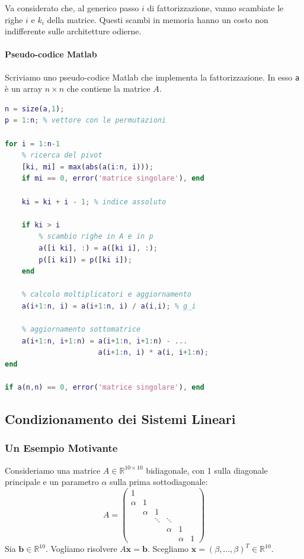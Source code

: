 Va considerato che, al generico passo $i$ di fattorizzazione, vanno scambiate le righe $i$ e $k_i$ della matrice. Questi scambi in memoria hanno un costo non indifferente sulle architetture odierne.

\paragraph{Pseudo-codice Matlab}
Scriviamo uno pseudo-codice Matlab che implementa la fattorizzazione. In esso \texttt{a} è un array $n \times n$ che contiene la matrice $A$.

\begin{lstlisting}[language=matlab, frame=none, numbers=none]
n = size(a,1);
p = 1:n; % vettore con le permutazioni

for i = 1:n-1
    % ricerca del pivot
    [ki, mi] = max(abs(a(i:n, i)));
    if mi == 0, error('matrice singolare'), end
    
    ki = ki + i - 1; % indice assoluto
    
    if ki > i
        % scambio righe in A e in p
        a([i ki], :) = a([ki i], :);
        p([i ki]) = p([ki i]);
    end
    
    % calcolo moltiplicatori e aggiornamento
    a(i+1:n, i) = a(i+1:n, i) / a(i,i); % g_i
    
    % aggiornamento sottomatrice
    a(i+1:n, i+1:n) = a(i+1:n, i+1:n) - ...
                      a(i+1:n, i) * a(i, i+1:n);
end

if a(n,n) == 0, error('matrice singolare'), end
\end{lstlisting}


\subsection{Condizionamento dei Sistemi Lineari}

\subsubsection{Un Esempio Motivante}
Consideriamo una matrice $A \in \mathbb{R}^{10 \times 10}$ bidiagonale, con 1 sulla diagonale principale e un parametro $\alpha$ sulla prima sottodiagonale:
$$ A = \begin{pmatrix} 
1 & & & & & \\
\alpha & 1 & & & & \\
& \alpha & 1 & & & \\
& & \ddots & \ddots & & \\
& & & \alpha & 1 & \\
& & & & \alpha & 1
\end{pmatrix} $$
Sia $\mathbf{b} \in \mathbb{R}^{10}$. Vogliamo risolvere $A\mathbf{x} = \mathbf{b}$.
Scegliamo $\mathbf{x} = (\beta, \dots, \beta)^T \in \mathbb{R}^{10}$.

